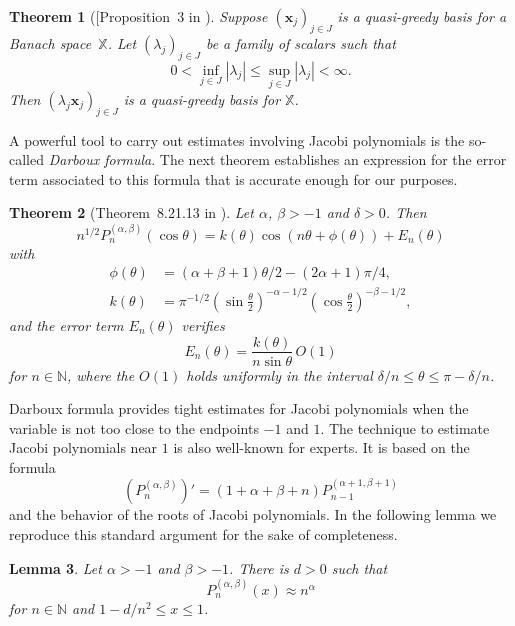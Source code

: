 \documentclass[11pt, leqno]{amsart}
\newtheorem{theorem}{Theorem}[section]
\newtheorem{lemma}[theorem]{Lemma}
\theoremstyle{remark}
\numberwithin{equation}{section}
\newcommand{\NN}{\ensuremath{\mathbb{N}}}
\newcommand{\XX}{\ensuremath{\mathbb{X}}}
\newcommand{\xx}{\ensuremath{\mathbf{x}}}
\begin{document}
\begin{theorem}[{[Proposition~3 in \cite{Wo2000}}]
\label{result:Perturbing} 
Suppose  $(\xx_j)_{j\in J}$ is a quasi-greedy basis for a Banach space~$\XX$. Let $(\lambda_j)_{j\in J}$ be a family of scalars such that
\[
0<\inf_{j\in J} |\lambda_j|\le \sup_{j\in J} |\lambda_j|<\infty.
\]
Then $(\lambda_j \xx_j)_{j\in J}$ is a quasi-greedy basis for $\XX$.
\end{theorem}


A powerful tool to carry out estimates involving Jacobi polynomials is the so-called \textit{Darboux formula}. The next theorem establishes an expression for the 
error term associated to this formula that is accurate enough for our purposes.

\begin{theorem}[Theorem~8.21.13 in \cite{Szego}]
\label{result:Darboux}
Let $\alpha$, $\beta>-1$ and $\delta>0$. Then
\begin{equation*}
n^{1/2} P_n^{(\alpha,\beta)}(\cos \theta)
= k(\theta)  \cos(n\theta+\phi(\theta))+ E_n(\theta) 
\end{equation*}
with 
\begin{equation*}
\begin{aligned}
\phi(\theta)
&= (\alpha+\beta+1)\theta/2-(2 \alpha+1)\pi/4, \\
k(\theta)
&= \pi^{-1/2}(\sin \tfrac{\theta}{2})^{-\alpha-1/2}
(\cos \tfrac{\theta}{2})^{-\beta-1/2},
\end{aligned}
\end{equation*}
and the error term $E_n(\theta)$ verifies
\[
E_n(\theta) = \frac{k(\theta)}{n \sin \theta} \, O(1)
\]
for $n\in\NN$, where the $O(1)$ holds uniformly in the interval 
${\delta}/{n}\le \theta \le \pi-{\delta}/{n}$.
\end{theorem}


Darboux formula provides tight estimates for Jacobi polynomials when the variable is not too close to the endpoints  $-1$ and $1$. The technique to estimate Jacobi polynomials near $1$ is also well-known for experts. It is based on the formula
\begin{equation}
\label{derivative}
\left(P_n^{(\alpha,\beta)}\right)'= (1+\alpha+\beta+n) P_{n-1}^{(\alpha+1,\beta+1)}
\end{equation}
and the behavior of the roots of Jacobi polynomials. In the following lemma we reproduce this standard argument for the sake of completeness.

\begin{lemma}
\label{result:NearOneEstimate}
Let $\alpha>-1$ and $\beta>-1$. There is $d>0$ such that
\[
P_n^{(\alpha,\beta)}(x)\approx n^\alpha
\]
for $n\in\NN$ and $1-d/n^2 \le x \le 1$.
\end{lemma}
\end{document}
